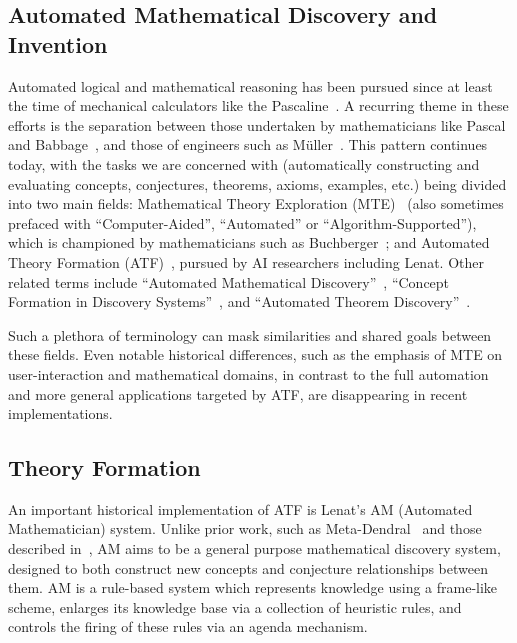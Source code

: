 \subsection{Automated Mathematical Discovery and Invention}

Automated logical and mathematical reasoning has been pursued since at least the
time of mechanical calculators like the Pascaline~\cite{ocagne93:_le_calcul_simpl}. A
recurring theme in these efforts is the separation between those undertaken by
mathematicians like Pascal and Babbage~\cite{bowden}, and those of engineers
such as M\"uller~\cite[p. 65]{lindgren}. This pattern continues today, with the
tasks we are concerned with (automatically constructing and evaluating concepts,
conjectures, theorems, axioms, examples, etc.) being divided into two main
fields: Mathematical Theory Exploration (MTE)~\cite{buchberger:06} (also
sometimes prefaced with ``Computer-Aided'', ``Automated'' or
``Algorithm-Supported''), which is championed by mathematicians such as
Buchberger~\cite{buchberger}; and Automated Theory Formation
(ATF)~\cite{lenat:77,colton:book}, pursued by AI researchers including Lenat.
Other related terms include ``Automated Mathematical
Discovery''~\cite{epstein:91,colton2000notion,esarm2008},
``Concept Formation in Discovery Systems''~\cite{haase}, and
``Automated Theorem Discovery''~\cite{roy}.

Such a plethora of terminology can mask similarities and shared goals between
these fields. Even notable historical differences, such as the emphasis of MTE
on user-interaction and mathematical domains, in contrast to the full automation
and more general applications targeted by ATF, are disappearing in recent
implementations.

\subsection{Theory Formation}

An important historical implementation of ATF is Lenat's AM (Automated
Mathematician) system. Unlike prior work, such as
Meta-Dendral~\cite{buchanan:75} and those described in~\cite{winston}, AM aims
to be a general purpose mathematical discovery system, designed to both
construct new concepts and conjecture relationships between them. AM is a
rule-based system which represents knowledge using a frame-like scheme, enlarges
its knowledge base via a collection of heuristic rules, and controls the firing
of these rules via an agenda mechanism.

